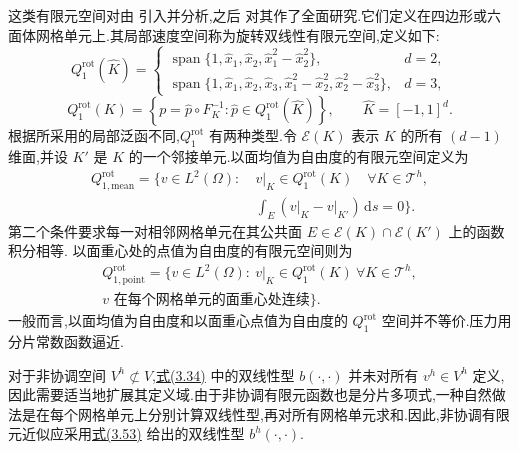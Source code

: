 \begin{note}\label{note:nonconforming-qrot-pairs}
这类有限元空间对由\textcite{RannacherTurek1992} 引入并分析,之后\textcite{Schieweck1997} 对其作了全面研究.它们定义在四边形或六面体网格单元上.其局部速度空间称为旋转双线性有限元空间,定义如下:
\[
  Q_1^{\mathrm{rot}}(\widehat K)=
  \begin{cases}
    \operatorname{span}\{1,\widehat x_1,\widehat x_2,
                  \widehat x_1^2-\widehat x_2^2\},&d=2,\\
    \operatorname{span}\{1,\widehat x_1,\widehat x_2,\widehat x_3,
       \widehat x_1^2-\widehat x_2^2,\widehat x_2^2-\widehat x_3^2\},&d=3,
  \end{cases}
\]
\[
  Q_1^{\mathrm{rot}}(K)=
  \left\{p=\widehat p\circ F_K^{-1}:
                 \widehat p\in Q_1^{\mathrm{rot}}(\widehat K)\right\},
  \qquad \widehat K=[-1,1]^d.
\]
根据所采用的局部泛函不同,$Q_1^{\mathrm{rot}}$ 有两种类型.令 $\mathcal{E}(K)$ 表示 $K$ 的所有 $(d-1)$ 维面,并设 $K'$ 是 $K$ 的一个邻接单元.以面均值为自由度的有限元空间定义为
\begin{equation}\label{eq:qrot-mean-value-space}
  \begin{aligned}
  Q_{1,\mathrm{mean}}^{\mathrm{rot}}
   =\{v\in L^2(\Omega):\
  &\left.v\right|_K\in Q_1^{\mathrm{rot}}(K)
       \quad\forall K\in\mathcal{T}^h,\\
  &\int_E\left(\left.v\right|_K-\left.v\right|_{K'}\right)\,\mathrm{d}s=0
  \}.
  \end{aligned}
\end{equation}
第二个条件要求每一对相邻网格单元在其公共面 $E\in\mathcal{E}(K)\cap\mathcal{E}(K')$ 上的函数积分相等.
以面重心处的点值为自由度的有限元空间则为
\[
  \begin{aligned}
  Q_{1,\mathrm{point}}^{\mathrm{rot}}
  =\{v\in L^2(\Omega):\
    \left.v\right|_K\in Q_1^{\mathrm{rot}}(K)
      \ \forall K\in\mathcal{T}^h,\\[-2pt]
  v\text{ 在每个网格单元的面重心处连续}\}.
  \end{aligned}
\]
一般而言,以面均值为自由度和以面重心点值为自由度的 $Q_1^{\mathrm{rot}}$ 空间并不等价.压力用分片常数函数逼近.
\end{note}

\begin{note}\label{note:nonconforming-bilinear-form}
对于非协调空间 $V^h\not\subset V$,\hyperref[eq:incompressible-bilinear-form]{式(3.34)} 中的双线性型 $b(\cdot,\cdot)$ 并未对所有 $v^h\in V^h$ 定义,因此需要适当地扩展其定义域.由于非协调有限元函数也是分片多项式,一种自然做法是在每个网格单元上分别计算双线性型,再对所有网格单元求和.因此,非协调有限元近似应采用\hyperref[eq:discrete-bilinear-form-b]{式(3.53)} 给出的双线性型 $b^h(\cdot,\cdot)$.
\end{note}

